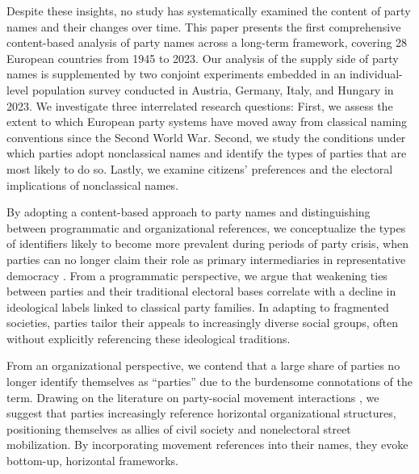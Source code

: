 \documentclass[12pt]{article}
\begin{document}
Despite these insights, no study has systematically examined the content of party names and their changes over time. This paper presents the first comprehensive content-based analysis of party names across a long-term framework, covering 28 European countries from 1945 to 2023. Our analysis of the supply side of party names is supplemented by two conjoint experiments embedded in an individual-level population survey conducted in Austria, Germany, Italy, and Hungary in 2023. We investigate three interrelated research questions: First, we assess the extent to which European party systems have moved away from classical naming conventions since the Second World War. Second, we study the conditions under which parties adopt nonclassical names and identify the types of parties that are most likely to do so. Lastly, we examine citizens' preferences and the electoral implications of nonclassical names.

By adopting a content-based approach to party names and distinguishing between programmatic and organizational references, we conceptualize the types of identifiers likely to become more prevalent during periods of party crisis, when parties can no longer claim their role as primary intermediaries in representative democracy \citep[][]{Mainwaring_et_al_2006, Mair_2013, Lupu_2016}. From a programmatic perspective, we argue that weakening ties between parties and their traditional electoral bases correlate with a decline in ideological labels linked to classical party families. In adapting to fragmented societies, parties tailor their appeals to increasingly diverse social groups, often without explicitly referencing these ideological traditions.

From an organizational perspective, we contend that a large share of parties no longer identify themselves as ``parties'' due to the burdensome connotations of the term. Drawing on the literature on party-social movement interactions \citep[][]{della_Porta_et_al_2017, Pirro_Gattinara_2018, Tarrow_2021, Castelli_Gattinara_Pirro_2024}, we suggest that parties increasingly reference horizontal organizational structures, positioning themselves as allies of civil society and nonelectoral street mobilization. By incorporating movement references into their names, they evoke bottom-up, horizontal frameworks.
\end{document}
